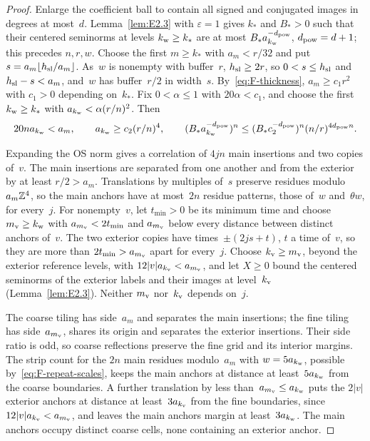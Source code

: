 \begin{proof}
Enlarge the coefficient ball to contain all signed and conjugated images in degrees at most~$d$. Lemma~\ref{lem:E2.3} with $\varepsilon=1$ gives $k_*$ and $B_*>0$ such that their centered seminorms at levels $k_{\rm w}\ge k_*$ are at most $B_* a_{k_{\rm w}}^{-d_{\rm pow}}$, $d_{\rm pow}=d+1$; this precedes $n,r,w$. Choose the first $m\ge k_*$ with $a_m<r/32$ and put $s=a_m\lfloor h_{\rm sl}/a_m\rfloor$. As~$w$ is nonempty with buffer~$r$, $h_{\rm sl}\ge2r$, so $0<s\le h_{\rm sl}$ and $h_{\rm sl}-s<a_m$, and~$w$ has buffer~$r/2$ in width~$s$. By~\eqref{eq:F-thickness}, $a_m\ge c_1r^2$ with $c_1>0$ depending on~$k_*$. Fix $0<\alpha\le1$ with $20\alpha<c_1$, and choose the first $k_{\rm w}\ge k_*$ with $a_{k_{\rm w}}<\alpha(r/n)^2$. Then
\begin{equation}\label{eq:F-repeat-scales}
20na_{k_{\rm w}}<a_m,\qquad a_{k_{\rm w}}\ge c_2(r/n)^4,\qquad
(B_*a_{k_{\rm w}}^{-d_{\rm pow}})^n\le (B_*c_2^{-d_{\rm pow}})^n(n/r)^{4d_{\rm pow}n}.
\end{equation}

Expanding the OS norm gives a correlation of $4jn$ main insertions and two copies of~$v$. The main insertions are separated from one another and from the exterior by at least $r/2>a_m$. Translations by multiples of~$s$ preserve residues modulo~$a_m\mathbb{Z}^4$, so the main anchors have at most~$2n$ residue patterns, those of~$w$ and~$\theta w$, for every~$j$. For nonempty~$v$, let $t_{\min}>0$ be its minimum time and choose $m_{\rm v}\ge k_{\rm w}$ with $a_{m_{\rm v}}<2t_{\min}$ and $a_{m_{\rm v}}$ below every distance between distinct anchors of~$v$. The two exterior copies have times~$\pm(2js+t)$, $t$ a time of~$v$, so they are more than $2t_{\min}>a_{m_{\rm v}}$ apart for every~$j$. Choose $k_{\rm v}\ge m_{\rm v}$, beyond the exterior reference levels, with $12|v|a_{k_{\rm v}}<a_{m_{\rm v}}$, and let $X\ge0$ bound the centered seminorms of the exterior labels and their images at level~$k_{\rm v}$ (Lemma~\ref{lem:E2.3}). Neither $m_{\rm v}$ nor~$k_{\rm v}$ depends on~$j$.

The coarse tiling has side~$a_m$ and separates the main insertions; the fine tiling has side~$a_{m_{\rm v}}$, shares its origin and separates the exterior insertions. Their side ratio is odd, so coarse reflections preserve the fine grid and its interior margins. The strip count for the $2n$ main residues modulo~$a_m$ with $w=5a_{k_{\rm w}}$, possible by~\eqref{eq:F-repeat-scales}, keeps the main anchors at distance at least~$5a_{k_{\rm w}}$ from the coarse boundaries. A further translation by less than~$a_{m_{\rm v}}\le a_{k_{\rm w}}$ puts the $2|v|$ exterior anchors at distance at least~$3a_{k_{\rm v}}$ from the fine boundaries, since $12|v|a_{k_{\rm v}}<a_{m_{\rm v}}$, and leaves the main anchors margin at least~$3a_{k_{\rm w}}$. The main anchors occupy distinct coarse cells, none containing an exterior anchor.


\end{proof}
